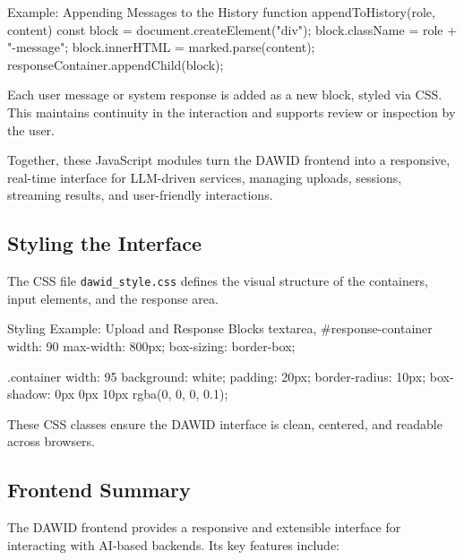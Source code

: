 \begin{codeonly}{Example: Appending Messages to the History}
function appendToHistory(role, content) {
	const block = document.createElement("div");
	block.className = role + "-message";
	block.innerHTML = marked.parse(content);
	responseContainer.appendChild(block);
}
\end{codeonly}

Each user message or system response is added as a new block, styled via CSS. This maintains continuity in the interaction and supports review or inspection by the user.

\vspace{1em}
Together, these JavaScript modules turn the DAWID frontend into a responsive, real-time interface for LLM-driven services, managing uploads, sessions, streaming results, and user-friendly interactions.

%
\subsection*{Styling the Interface}

The CSS file \texttt{dawid\_style.css} defines the visual structure of the containers, input elements, and the response area.

\begin{codeonly}{Styling Example: Upload and Response Blocks}
textarea, #response-container {
    width: 90%
    max-width: 800px;
    box-sizing: border-box;
}

.container {
    width: 95%
    background: white;
    padding: 20px;
    border-radius: 10px;
    box-shadow: 0px 0px 10px rgba(0, 0, 0, 0.1);
}
\end{codeonly}

These CSS classes ensure the DAWID interface is clean, centered, and readable across browsers.

%
\subsection*{Frontend Summary}

The DAWID frontend provides a responsive and extensible interface for interacting with AI-based backends. Its key features include:

